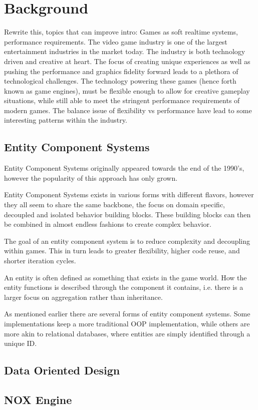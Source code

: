 \section*{Background}

\todo
{Rewrite this, topics that can improve intro: Games as soft realtime systems, performance requirements.}
The video game industry is one of the largest entertainment industries in the market today.
The industry is both technology driven and creative at heart. 
The focus of creating unique experiences as well as pushing the performance and graphics fidelity forward leads to a plethora of technological challenges.
The technology powering these games (hence forth known as game engines), must be flexible enough to allow for creative gameplay situations, while still able to meet the stringent performance requirements of modern games.
The balance issue of flexibility vs performance have lead to some interesting patterns within the industry.

\subsection*{Entity Component Systems}
Entity Component Systems originally appeared towards the end of the 1990's, however the popularity of this approach has only grown. \cite{wikipedia_ecs_history}

Entity Component Systems exists in various forms with different flavors, however they all seem to share the same backbone, the focus on domain specific, decoupled and isolated behavior building blocks.
These building blocks can then be combined in almost endless fashions to create complex behavior. 

The goal of an entity component system is to reduce complexity and decoupling within games. This in turn leads to greater flexibility, higher code reuse, and shorter iteration cycles. 

An entity is often defined as something that exists in the game world. How the entity functions is described through the component it contains, i.e. there is a larger focus on aggregation rather than inheritance. 

As mentioned earlier there are several forms of entity component systems. Some implementations keep a more traditional OOP implementation, 
while others are more akin to relational databases, where entities are simply identified through a unique ID. \cite{t_machine_ecs_are_the_future_p2} 

\subsection*{Data Oriented Design}

\subsection*{NOX Engine}